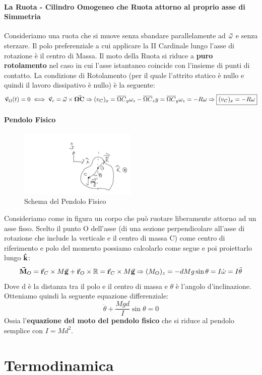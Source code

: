 \documentclass{article}
\newcommand{\R}{\mathbb{R}}
\newcommand{\then}{\ensuremath{\Rightarrow}}
\renewcommand{\k}{\vu{k}}
\renewcommand{\v}{\va{v}}
\renewcommand{\r}{\va{r}}
\newcommand{\M}{\va{M}}
\begin{document}
\paragraph{La Ruota - Cilindro Omogeneo che Ruota attorno al proprio asse di Simmetria}
Consideriamo una ruota che si muove senza sbandare parallelamente ad $\va{\omega}$ e senza sterzare. Il polo preferenziale a cui applicare la II Cardinale lungo l'asse di rotazione è il centro di Massa. 
Il moto della Ruota si riduce a \textbf{puro rotolamento} nel caso in cui l'asse istantaneo coincide con l'insieme di punti di contatto. La condizione di Rotolamento (per il quale l'attrito statico è nullo e quindi il lavoro dissipativo è nullo) è la seguente:
\[\v_\Omega(t)=0\iff \v_c=\va{\omega}\times\va{\Omega C}\then(v_C)_x=\overline{\Omega C}_y\omega_z-\overline{\Omega C}_zy=\overline{\Omega C}_y\omega_z=-R\omega\then\boxed{(v_C)_x=-R\omega}\]

\paragraph{Pendolo Fisico}
\begin{figure}[H]
    \centering
    \includegraphics[width=0.5\textwidth]{PendoloFisico.png}
    \caption{Schema del Pendolo Fisico}
    \label{PendoloFisico}
\end{figure}
Consideriamo come in figura un corpo che può ruotare liberamente attorno ad un asse fisso. Scelto il punto O dell'asse (di una sezione perpendicolare all'asse di rotazione che include la verticale e il centro di massa C) come centro di riferimento e polo del momento possiamo calcolarlo come segue e poi proiettarlo lungo $\k$:
\[\M_O=\r_C\times M\va{g}+\r_O\times\R=\r_C\times M\va{g}\then (M_O)_z=-dMg\sin\theta=I\dot{\omega}=I\ddot{\theta}\]
Dove d è la distanza tra il polo e il centro di massa e $\theta$ è l'angolo d'inclinazione.
Otteniamo quindi la seguente equazione differenziale:
\[\boxed{\ddot{\theta}+\frac{Mgd}{I}\sin\theta=0}\]
Ossia l'\textbf{equazione del moto del pendolo fisico} che si riduce al pendolo semplice con $I=Md^2$.
\section{Termodinamica}
\end{document}
